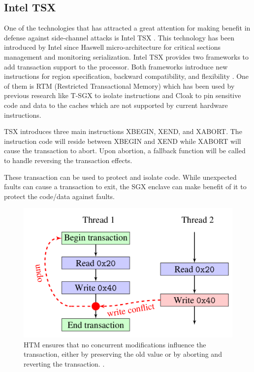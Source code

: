 \subsection{Intel TSX}
One of the technologies that has attracted a great attention for making benefit in defense against side-channel attacks is Intel TSX \cite{tsx}. This technology has been introduced by Intel since Haswell micro-architecture \cite{haswell} for critical sections management and monitoring serialization. Intel TSX provides two frameworks to add transaction support to the processor. Both frameworks introduce new instructions for region specification, backward compatibility, and flexibility \cite{tsx}. One of them is RTM (Restricted Transactional Memory) \cite{rtm} which has been used by previous research like T-SGX \cite{tsgx} to isolate instructions and Cloak \cite{cloak} to pin sensitive code and data to the caches which are not supported by current hardware instructions.

TSX introduces three main instructions XBEGIN, XEND, and XABORT. The instruction code will reside between XBEGIN and XEND while XABORT will cause the transaction to abort. Upon abortion, a fallback function will be called to handle reversing the transaction effects.

These transaction can be used to protect and isolate code. While unexpected faults can cause a transaction to exit, the SGX enclave can make benefit of it to protect the code/data against faults.
\begin{figure}
	\includegraphics[scale=0.2]{images/rtm}
	\caption{HTM ensures that no concurrent modifications influence the transaction, either by preserving the old value or by aborting and reverting the transaction. \cite{cloak}.}
	\label{fig:rtm}
\end{figure}


